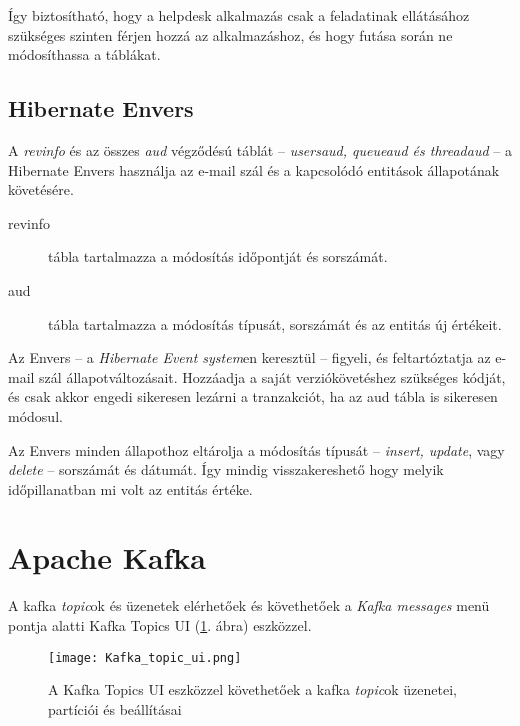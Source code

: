 Így biztosítható, hogy a helpdesk alkalmazás csak a feladatinak ellátásához szükséges szinten férjen hozzá az alkalmazáshoz, és hogy futása során ne módosíthassa a táblákat. 


\subsection{Hibernate Envers}\label{sec:hubernate_envers}
A \textit{revinfo} és az összes \textit{\textunderscore aud} végződésú táblát --  \textit{\mbox{users\textunderscore aud}, \mbox{queue\textunderscore aud} és \mbox{thread\textunderscore aud}} --   a Hibernate Envers használja az e-mail szál és a kapcsolódó entitások állapotának követésére.

\begin{description}
	\item[revinfo] tábla tartalmazza a módosítás időpontját és sorszámát.
	
	\item[\textunderscore aud] tábla tartalmazza a módosítás típusát, sorszámát és az entitás új értékeit.
\end{description}

Az Envers --  a \textit{Hibernate Event system}en keresztül --   figyeli, és feltartóztatja az e-mail szál állapotváltozásait. Hozzáadja a saját verziókövetéshez szükséges kódját, és csak akkor engedi sikeresen lezárni a tranzakciót, ha az \textunderscore aud tábla is sikeresen módosul.

Az Envers minden állapothoz eltárolja a módosítás típusát --  \textit{insert, update}, vagy \textit{delete} --   sorszámát és dátumát. Így mindig visszakereshető hogy melyik időpillanatban mi volt az entitás értéke.



\section{Apache Kafka}\label{sec:kafka_topics}
A kafka \textit{topic}ok és üzenetek elérhetőek és követhetőek a \textit{Kafka messages} menü pontja alatti Kafka Topics UI (\ref{fig:Kafka_Topics_UI}. ábra) eszközzel.

\begin{figure}[hbt] 
	\centering
	\texttt{[image: Kafka\_topic\_ui.png]}
	\caption[A Kafka Topics UI felülete]{A Kafka Topics UI eszközzel követhetőek a kafka \textit{topic}ok üzenetei, partíciói és beállításai}
	\label{fig:Kafka_Topics_UI}
\end{figure}


